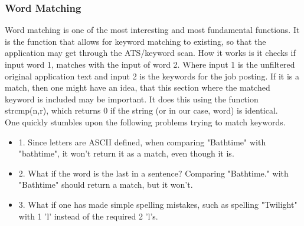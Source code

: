 \subsubsection{Word Matching}
Word matching is one of the most interesting and most fundamental functions. 
It is the function that allows for keyword matching to existing, so that the application
may get through the ATS/keyword scan. How it works is it checks if input word 1, matches with the input of word 2.
Where input 1 is the unfiltered original application text and input 2 is the keywords for the job posting.
If it is a match, then one might have an idea, that this section where the matched keyword is included may be important.
It does this using the function strcmp(n,r), which returns 0 if the string (or in our case, word) is identical.
\\
One quickly stumbles upon the following problems trying to match keywords.
\begin{itemize}
  \item 1. Since letters are ASCII defined, when comparing "Bathtime" with "bathtime", it won't return it as a match, even though it is.
  \item 2. What if the word is the last in a sentence? Comparing "Bathtime." with "Bathtime" should return a match, but it won't.
  \item 3. What if one has made simple spelling mistakes, such as spelling "Twilight" with 1 'l' instead of the required 2 'l's.
\end{itemize}

